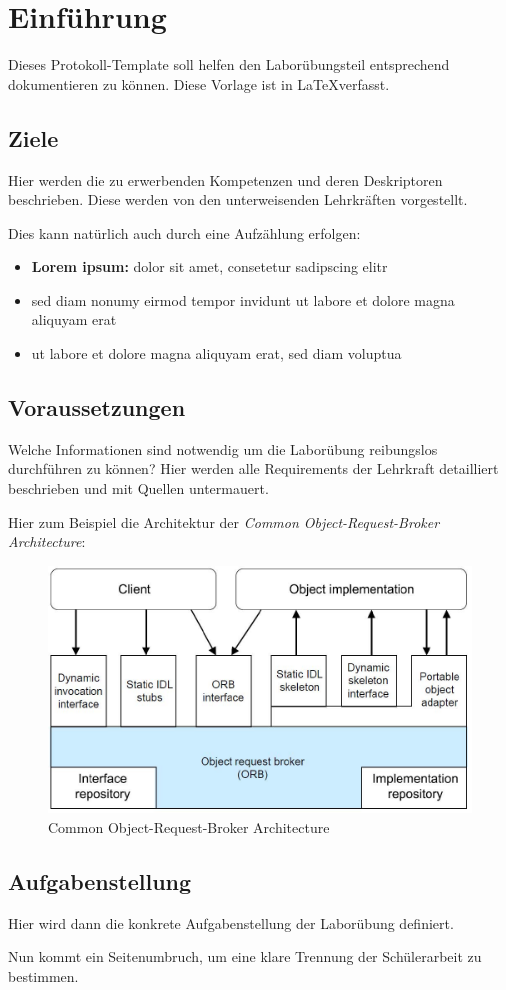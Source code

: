 
\section{Einführung}
Dieses Protokoll-Template soll helfen den Laborübungsteil entsprechend dokumentieren zu können. Diese Vorlage ist in \LaTeX  verfasst.

\subsection{Ziele}
Hier werden die zu erwerbenden Kompetenzen und deren Deskriptoren beschrieben. Diese werden von den unterweisenden Lehrkräften vorgestellt.

Dies kann natürlich auch durch eine Aufzählung erfolgen:

\begin{itemize}
	\item \textbf{Lorem ipsum:} dolor sit amet, consetetur sadipscing elitr
	\item sed diam nonumy eirmod tempor invidunt ut labore et dolore magna aliquyam erat
	\item ut labore et dolore magna aliquyam erat, sed diam voluptua
\end{itemize}


\subsection{Voraussetzungen}
Welche Informationen sind notwendig um die Laborübung reibungslos durchführen zu können? Hier werden alle Requirements der Lehrkraft detailliert beschrieben und mit Quellen untermauert.

Hier zum Beispiel die Architektur der \textit{Common Object-Request-Broker Architecture}:
\begin{figure}[!h]
	\begin{center}
		\includegraphics[width=0.5\linewidth]{images/corba.jpg}
		\caption{Common Object-Request-Broker Architecture \cite{tanenbaum2007verteilte}}
		\label{broker}
	\end{center}
\end{figure}


\subsection{Aufgabenstellung}
Hier wird dann die konkrete Aufgabenstellung der Laborübung definiert.

Nun kommt ein Seitenumbruch, um eine klare Trennung der Schülerarbeit zu bestimmen.
\clearpage
